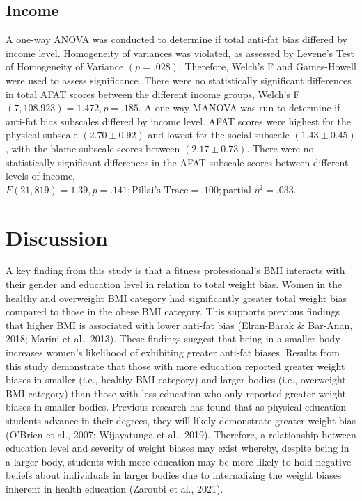 \documentclass[
  jou,
  longtable,
  nolmodern,
  notxfonts,
  notimes,
  colorlinks=true,linkcolor=blue,citecolor=blue,urlcolor=blue]{apa7}
\begin{document}
\subsection{Income}\label{income}

A one-way ANOVA was conducted to determine if total anti-fat bias
differed by income level. Homogeneity of variances was violated, as
assessed by Levene's Test of Homogeneity of Variance \((p = .028)\).
Therefore, Welch's F and Games-Howell were used to assess significance.
There were no statistically significant differences in total AFAT scores
between the different income groups, Welch's F
\((7, 108.923) = 1.472, p = .185\). A one-way MANOVA was run to
determine if anti-fat bias subscales differed by income level. AFAT
scores were highest for the physical subscale \((2.70 \pm 0.92)\) and
lowest for the social subscale \((1.43 \pm 0.45)\), with the blame
subscale scores between \((2.17 \pm 0.73)\). There were no statistically
significant differences in the AFAT subscale scores between different
levels of income,
\(F(21,819) = 1.39, p = .141; \text{Pillai’s Trace} = .100; \text{partial } \eta^2 = .033\).

\section{Discussion}\label{discussion}

A key finding from this study is that a fitness professional's BMI
interacts with their gender and education level in relation to total
weight bias. Women in the healthy and overweight BMI category had
significantly greater total weight bias compared to those in the obese
BMI category. This supports previous findings that higher BMI is
associated with lower anti-fat bias (Elran-Barak \& Bar-Anan, 2018;
Marini et al., 2013). These findings suggest that being in a smaller
body increases women's likelihood of exhibiting greater anti-fat biases.
Results from this study demonstrate that those with more education
reported greater weight biases in smaller (i.e., healthy BMI category)
and larger bodies (i.e., overweight BMI category) than those with less
education who only reported greater weight biases in smaller bodies.
Previous research has found that as physical education students advance
in their degrees, they will likely demonstrate greater weight bias
(O'Brien et al., 2007; Wijayatunga et al., 2019). Therefore, a
relationship between education level and severity of weight biases may
exist whereby, despite being in a larger body, students with more
education may be more likely to hold negative beliefs about individuals
in larger bodies due to internalizing the weight biases inherent in
health education (Zaroubi et al., 2021).
\end{document}
